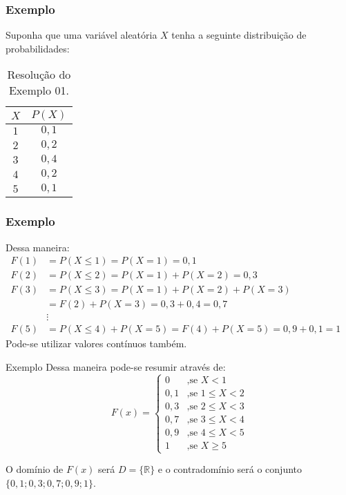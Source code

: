 \documentclass[hyperref={pdfpagelabels=false}]{beamer}
\begin{document}
\begin{frame}
	\frametitle{Exemplo}

Suponha que uma variável aleatória $X$ tenha a seguinte distribuição de probabilidades: \pause
\begin{table}[!h]
	\centering
	\begin{tabular}{|c|c|}
		\hline
		$X$		&	$P(X)$ \\ \hline 
		$1$		&	$0,1$	\\ \hline 
		$2$		&	$0,2$	\\ \hline 
		$3$		&	$0,4$	\\ \hline
		$4$		&	$0,2$	\\ \hline
		$5$		&	$0,1$	\\ \hline
	\end{tabular}
	\caption{Resolução do Exemplo 01.}
\end{table}
\end{frame}

\begin{frame}
	\frametitle{Exemplo}

Dessa maneira:
\pause
\begin{align*}
F(1) &= P(X \leq 1) = P(X=1) = 0,1 \\ 
F(2) &= P(X \leq 2) = P(X=1) + P(X=2) = 0,3 \\ 
F(3) &= P(X \leq 3) = P(X=1) + P(X=2) + P(X=3)\\
& = F(2) + P(X=3) = 0,3 + 0,4 = 0,7 \\ 
&\vdots& \\ 
F(5) &= P(X \leq 4) + P(X = 5) = F(4) + P(X=5) = 0,9 + 0,1 = 1
\end{align*}
\pause
Pode-se utilizar valores contínuos também.

\end{frame}

\begin{frame}{Exemplo}
	Dessa maneira pode-se resumir através de:
	$$F(x) = \begin{cases}
	0	& \text{,se } X < 1 \\
	0,1 & \text{,se } 1 \leq X < 2 \\
	0,3 & \text{,se } 2 \leq X < 3 \\
	0,7 & \text{,se } 3 \leq X < 4 \\
	0,9 & \text{,se } 4 \leq X < 5 \\
	1   & \text{,se } X \geq 5
	\end{cases}$$
\pause

O domínio de $F(x)$ será $D = \{\mathbb{R}\}$ e o contradomínio será o conjunto $\{ 0,1;0,3;0,7;0,9;1 \}$.

\end{frame}
\end{document}
